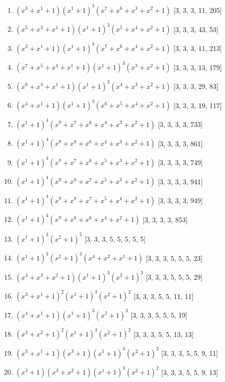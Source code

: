 \documentclass[10pt,twocolumn]{article}
\begin{document}
\begin{enumerate}
\item $(x^{3} + x^{1} + 1)(x^{1} + 1)^{3}(x^{7} + x^{6} + x^{3} + x^{2} + 1)$  [3, 3, 3, 11, 205]
\item $(x^{5} + x^{3} + x^{1} + 1)(x^{1} + 1)^{3}(x^{5} + x^{4} + x^{2} + 1)$  [3, 3, 3, 43, 53]
\item $(x^{3} + x^{1} + 1)(x^{1} + 1)^{3}(x^{7} + x^{6} + x^{4} + x^{2} + 1)$  [3, 3, 3, 11, 213]
\item $(x^{7} + x^{5} + x^{4} + x^{1} + 1)(x^{1} + 1)^{3}(x^{3} + x^{2} + 1)$  [3, 3, 3, 13, 179]
\item $(x^{6} + x^{4} + x^{1} + 1)(x^{1} + 1)^{3}(x^{4} + x^{3} + x^{2} + 1)$  [3, 3, 3, 29, 83]
\item $(x^{4} + x^{1} + 1)(x^{1} + 1)^{3}(x^{6} + x^{5} + x^{4} + x^{2} + 1)$  [3, 3, 3, 19, 117]
\item $(x^{1} + 1)^{4}(x^{9} + x^{7} + x^{6} + x^{4} + x^{3} + x^{2} + 1)$  [3, 3, 3, 3, 733]
\item $(x^{1} + 1)^{4}(x^{9} + x^{8} + x^{6} + x^{4} + x^{3} + x^{2} + 1)$  [3, 3, 3, 3, 861]
\item $(x^{1} + 1)^{4}(x^{9} + x^{7} + x^{6} + x^{5} + x^{3} + x^{2} + 1)$  [3, 3, 3, 3, 749]
\item $(x^{1} + 1)^{4}(x^{9} + x^{8} + x^{7} + x^{5} + x^{3} + x^{2} + 1)$  [3, 3, 3, 3, 941]
\item $(x^{1} + 1)^{4}(x^{9} + x^{8} + x^{7} + x^{5} + x^{4} + x^{2} + 1)$  [3, 3, 3, 3, 949]
\item $(x^{1} + 1)^{4}(x^{9} + x^{8} + x^{6} + x^{4} + x^{2} + 1)$  [3, 3, 3, 3, 853]
\item $(x^{1} + 1)^{3}(x^{2} + 1)^{5}$  [3, 3, 3, 5, 5, 5, 5, 5]
\item $(x^{1} + 1)^{3}(x^{2} + 1)^{3}(x^{4} + x^{2} + x^{1} + 1)$  [3, 3, 3, 5, 5, 5, 23]
\item $(x^{4} + x^{3} + x^{2} + 1)(x^{1} + 1)^{3}(x^{2} + 1)^{3}$  [3, 3, 3, 5, 5, 5, 29]
\item $(x^{3} + x^{1} + 1)^{2}(x^{1} + 1)^{3}(x^{2} + 1)^{2}$  [3, 3, 3, 5, 5, 11, 11]
\item $(x^{4} + x^{1} + 1)(x^{1} + 1)^{3}(x^{2} + 1)^{3}$  [3, 3, 3, 5, 5, 5, 19]
\item $(x^{3} + x^{2} + 1)^{2}(x^{1} + 1)^{3}(x^{2} + 1)^{2}$  [3, 3, 3, 5, 5, 13, 13]
\item $(x^{3} + x^{1} + 1)(x^{3} + 1)(x^{1} + 1)^{3}(x^{2} + 1)^{2}$  [3, 3, 3, 5, 5, 9, 11]
\item $(x^{3} + 1)(x^{3} + x^{2} + 1)(x^{1} + 1)^{3}(x^{2} + 1)^{2}$  [3, 3, 3, 5, 5, 9, 13]

\end{enumerate}
\end{document}

